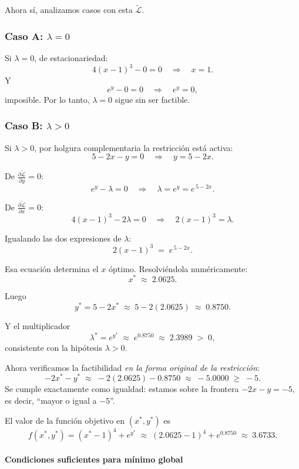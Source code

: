 \documentclass{article}
\begin{document}
Ahora sí, analizamos casos con esta \(\widetilde{\mathcal{L}}\).

\subsubsection*{Caso A: \(\lambda = 0\)}

Si \(\lambda = 0\), de estacionariedad:
\[
4(x-1)^3 - 0 = 0
\quad\Longrightarrow\quad
x = 1.
\]
Y
\[
e^{y} - 0 = 0
\quad\Longrightarrow\quad
e^{y} = 0,
\]
imposible.  
Por lo tanto, \(\lambda=0\) sigue sin ser factible.

\subsubsection*{Caso B: \(\lambda > 0\)}

Si \(\lambda > 0\), por holgura complementaria la restricción está activa:
\[
5 - 2x - y = 0
\quad\Longrightarrow\quad
y = 5 - 2x.
\]

De \(\frac{\partial \widetilde{\mathcal{L}}}{\partial y}=0\):
\[
e^{y} - \lambda = 0
\quad\Longrightarrow\quad
\lambda = e^{y} = e^{\,5-2x}.
\]

De \(\frac{\partial \widetilde{\mathcal{L}}}{\partial x}=0\):
\[
4(x-1)^3 - 2\lambda = 0
\quad\Longrightarrow\quad
2(x-1)^3 = \lambda.
\]

Igualando las dos expresiones de \(\lambda\):
\[
2(x-1)^3 \;=\; e^{\,5-2x}.
\]

Esa ecuación determina el \(x\) óptimo. Resolviéndola numéricamente:
\[
x^* \;\approx\; 2.0625.
\]

Luego
\[
y^* = 5 - 2x^* 
\;\approx\; 5 - 2(2.0625)
\;\approx\; 0.8750.
\]

Y el multiplicador
\[
\lambda^* = e^{y^*}
\;\approx\; e^{0.8750}
\;\approx\; 2.3989 \;>\; 0,
\]
consistente con la hipótesis \(\lambda>0\).

Ahora verificamos la factibilidad \emph{en la forma original de la restricción}:
\[
-2x^* - y^*
\;\approx\;
-2(2.0625) - 0.8750
\;\approx\;
-5.0000
\;\ge\;
-5.
\]
Se cumple exactamente como igualdad: estamos sobre la frontera \(-2x-y=-5\), es decir, ``mayor o igual a \(-5\)''.

El valor de la función objetivo en \((x^*,y^*)\) es
\[
f(x^*,y^*) 
= (x^*-1)^4 + e^{y^*}
\;\approx\;
(2.0625-1)^4 + e^{0.8750}
\;\approx\;
3.6733.
\]

\paragraph{Condiciones suficientes para mínimo global}
\end{document}
